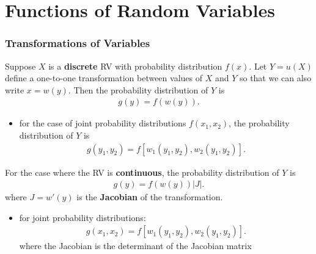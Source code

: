 \documentclass[10pt]{article}
\begin{document}
\newpage
\part{Functions of Random Variables}
\section{Transformations of Variables}
\begin{theorem}
    Suppose $X$ is a \textbf{discrete} RV with probability distribution $f(x)$. Let $Y = u(X)$ define a one-to-one transformation between values of $X$ and $Y$ so that we can also write $x = w(y)$. Then the probability distribution of $Y$ is
    \begin{align*}
        g(y) = f(w(y))
    .\end{align*}
    \begin{itemize}
        \item for the case of joint probability distributions $f(x_1, x_2)$, the probability distribution of $Y$ is 
            \begin{align*}
                g(y_1, y_2) = f[w_1(y_1, y_2), w_2(y_1, y_2)]
            .\end{align*}
    \end{itemize}
\end{theorem}
\begin{theorem}
    For the case where the RV is \textbf{continuous}, the probability distribution of $Y$ is 
    \begin{align*}
        g(y) = f(w(y))|J|
    .\end{align*}
    where $J = w'(y)$ is the \textbf{Jacobian} of the transformation.
    \begin{itemize}
        \item for joint probability distributions:
            \begin{align*}
                g(x_1, x_2) = f[w_1(y_1, y_2), w_2(y_1, y_2)]
            .\end{align*}
            where the Jacobian is the determinant of the Jacobian matrix

    \end{itemize}
\end{theorem}
\end{document}
